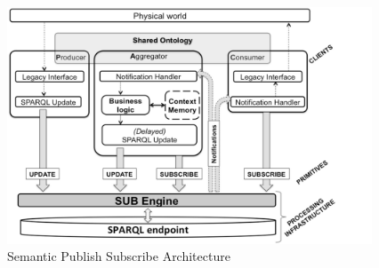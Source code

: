 \documentclass[11pt]{article}
\begin{document}
\begin{figure}[H]
	\includegraphics[width=\textwidth,height=200pt]{assets/SPS_Architecture.png}
	\caption{Semantic Publish Subscribe Architecture\cite{article_SPS}}
	\label{fig:Semantic-Publish-Subscribe-Architecture}
\end{figure}
\end{document}
